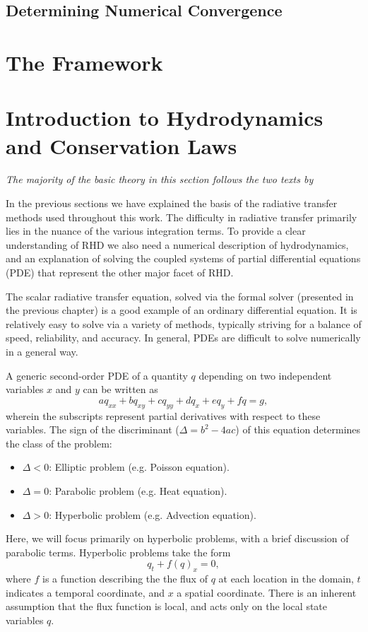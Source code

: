 \subsection{Determining Numerical Convergence}

\section{The \Lw{} Framework}




\section{Introduction to Hydrodynamics and Conservation Laws}
\emph{The majority of the basic theory in this section follows the two texts by \citet{LeVeque1997}}

In the previous sections we have explained the basis of the radiative transfer methods used throughout this work.
The difficulty in radiative transfer primarily lies in the nuance of the various integration terms.
To provide a clear understanding of RHD we also need a numerical description of hydrodynamics, and an explanation of solving the coupled systems of partial differential equations (PDE) that represent the other major facet of RHD.

The scalar radiative transfer equation, solved via the formal solver (presented in the previous chapter) is a good example of an ordinary differential equation.
It is relatively easy to solve via a variety of methods, typically striving for a balance of speed, reliability, and accuracy.
In general, PDEs are difficult to solve numerically in a general way.

A generic second-order PDE of a quantity $q$ depending on two independent variables $x$ and $y$ can be written as
\begin{equation}
    aq_{xx} + bq_{xy} + cq_{yy} + dq_x + eq_y + fq = g,
\end{equation}
wherein the subscripts represent partial derivatives with respect to these variables.
The sign of the discriminant ($\Delta = b^2-4ac$) of this equation determines the class of the problem:
\begin{itemize}
    \item $\Delta < 0$: Elliptic problem (e.g. Poisson equation).
    \item $\Delta = 0$: Parabolic problem (e.g. Heat equation).
    \item $\Delta > 0$: Hyperbolic problem (e.g. Advection equation).
\end{itemize}
Here, we will focus primarily on hyperbolic problems, with a brief discussion of parabolic terms.
Hyperbolic problems take the form
\begin{equation}\label{Eq:ConsLaw}
    q_t + f(q)_x = 0,
\end{equation}
where $f$ is a function describing the the flux of $q$ at each location in the domain, $t$ indicates a temporal coordinate, and $x$ a spatial coordinate.
There is an inherent assumption that the flux function is local, and acts only on the local state variables $q$.

